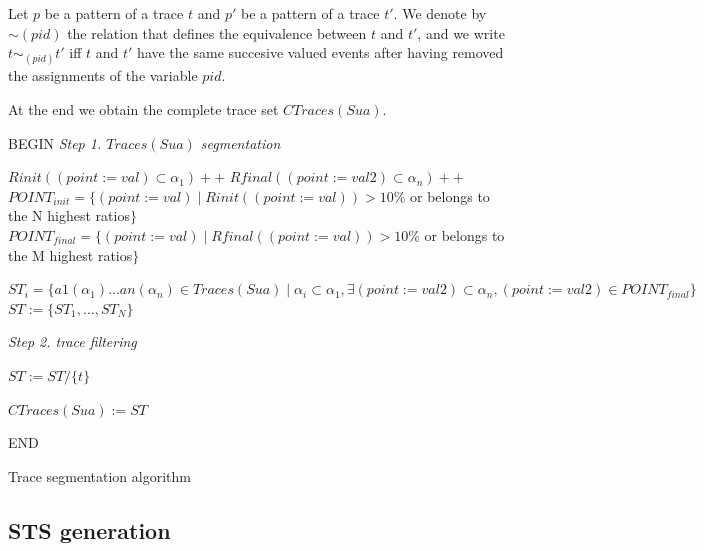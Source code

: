 \begin{definition}
    Let $p$ be a pattern of a trace $t$ and $p'$ be a pattern of
    a trace $t'$. We denote by $\sim{(pid)}$ the relation that
    defines the equivalence between $t$ and $t'$, and we write
    $t \sim_{(pid)} t'$ iff $t$ and $t'$ have the same succesive
    valued events after having removed the assignments of the
    variable $pid$.
\end{definition}

At the end we obtain the complete trace set $CTraces(Sua)$.



\begin{algorithm}[h]


\BlankLine
BEGIN\;
\emph{Step 1. $Traces(Sua)$ segmentation}

 {
$Rinit((point:=val)\subset \alpha_1)++$\;
$Rfinal((point:=val2)\subset \alpha_n)++$\;
}
$POINT_{init}=\{(point:=val) \mid Rinit((point:=val))>10$\% or belongs to the N highest ratios$\}$\;
$POINT_{final}=\{(point:=val) \mid Rfinal((point:=val))>10$\% or belongs to the M highest ratios$\}$\;
\BlankLine

 {
	$ST_i=\{a1(\alpha_1)...an(\alpha_n)\in Traces(Sua) \mid \alpha_i\subset \alpha_1, \exists (point:=val2)\subset \alpha_n, (point:=val2)\in POINT_{final}    \}$\;
}
$ST:=\{ST_1,...,ST_N\}$\;

\BlankLine
\emph{Step 2. trace filtering}

 {
	{
		$ST:= ST/ \{  t \}$\;
	}


	}

    $CTraces(Sua) := ST$

END\;

\caption{Trace segmentation algorithm}
\label{algo_traces}
\end{algorithm}

\subsection{STS generation}
\label{sec:modelinf:prodsystems:generation}

